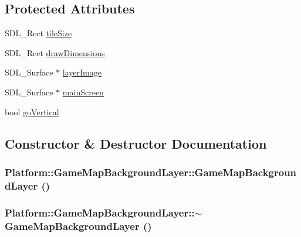 \subsection*{Protected Attributes}
\begin{CompactItemize}
\item 
SDL\_\-Rect \hyperlink{class_platform_1_1_game_map_background_layer_0a7874223f9c9d037004edaee52fd6d2}{tileSize}
\item 
SDL\_\-Rect \hyperlink{class_platform_1_1_game_map_background_layer_c9d873f233fe780e9e1cf90bfd4458e2}{drawDimensions}
\item 
SDL\_\-Surface $\ast$ \hyperlink{class_platform_1_1_game_map_layer_b94756f95136f23ec04b70ecb6351e2e}{layerImage}
\item 
SDL\_\-Surface $\ast$ \hyperlink{class_platform_1_1_game_map_layer_8a269526befbbbcc5b0d201f659c90fe}{mainScreen}
\item 
bool \hyperlink{class_platform_1_1_game_map_layer_e4f38bbcc758a8099c296f130912f8f6}{goVertical}
\end{CompactItemize}


\subsection{Constructor \& Destructor Documentation}
\hypertarget{class_platform_1_1_game_map_background_layer_16460906bb5c157b819a509d36492bbc}{
\subsubsection[{GameMapBackgroundLayer}]{\setlength{\rightskip}{0pt plus 5cm}Platform::GameMapBackgroundLayer::GameMapBackgroundLayer ()}}
\label{df/d72/class_platform_1_1_game_map_background_layer_16460906bb5c157b819a509d36492bbc}


\hypertarget{class_platform_1_1_game_map_background_layer_e2472fc42632246e23270264e568887a}{
\subsubsection[{$\sim$GameMapBackgroundLayer}]{\setlength{\rightskip}{0pt plus 5cm}Platform::GameMapBackgroundLayer::$\sim$GameMapBackgroundLayer ()}}
\label{df/d72/class_platform_1_1_game_map_background_layer_e2472fc42632246e23270264e568887a}




